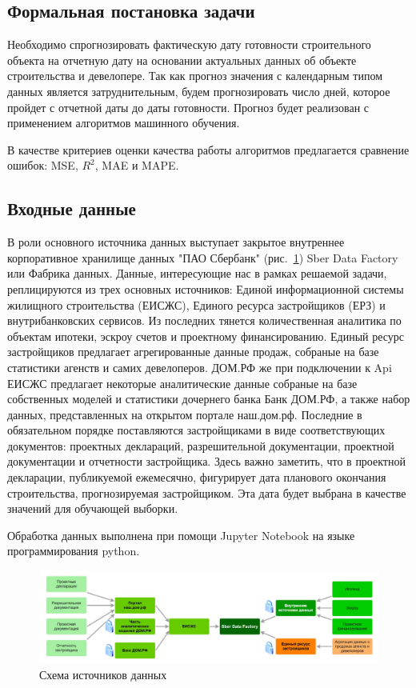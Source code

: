 \documentclass[12pt,a4paper]{article} %
\begin{document}
\subsection{Формальная постановка задачи}

Необходимо спрогнозировать фактическую дату готовности строительного объекта на отчетную дату на основании актуальных данных об объекте строительства и девелопере. Так как прогноз значения с календарным типом данных является затруднительным, будем прогнозировать число дней, которое пройдет с отчетной даты до даты готовности. Прогноз будет реализован с применением алгоритмов машинного обучения.

В качестве критериев оценки качества работы алгоритмов предлагается сравнение ошибок: MSE, $R^2$, MAE и MAPE.

\subsection{Входные данные}

В роли основного источника данных выступает закрытое внутреннее корпоративное хранилище данных "ПАО Сбербанк" (рис.~\ref{fig:data_source}) Sber Data Factory или Фабрика данных. Данные, интересующие нас в рамках решаемой задачи,  реплицируются из трех основных источников: Единой информационной системы жилищного строительства (ЕИСЖС), Единого ресурса застройщиков (ЕРЗ) и внутрибанковских сервисов. Из последних тянется количественная аналитика по объектам ипотеки, эскроу счетов и проектному финансированию. Единый ресурс застройщиков предлагает агрегированные данные продаж, собраные на базе статистики агенств и самих девелоперов. ДОМ.РФ же при подключении к Api ЕИСЖС  предлагает некоторые аналитические данные собраные на базе собственных моделей и статистики дочернего банка Банк ДОМ.РФ, а также набор данных, представленных на открытом портале наш.дом.рф. Последние в обязательном порядке поставляются застройщиками в виде соответствующих документов: проектных деклараций, разрешительной документации, проектной документации и отчетности застройщика. 
Здесь важно заметить, что в проектной декларации, публикуемой ежемесячно, фигурирует дата планового окончания строительства, прогнозируемая застройщиком. Эта дата будет выбрана в качестве значений для обучающей выборки.  

Обработка данных выполнена при помощи Jupyter Notebook на языке программирования python.

\begin{figure}[h]
	
	\centering
	
	\includegraphics[width=\linewidth]{data_source.jpg}
	
	\caption{Схема источников данных}
	
	\label{fig:data_source}
	
\end{figure}
\end{document}

